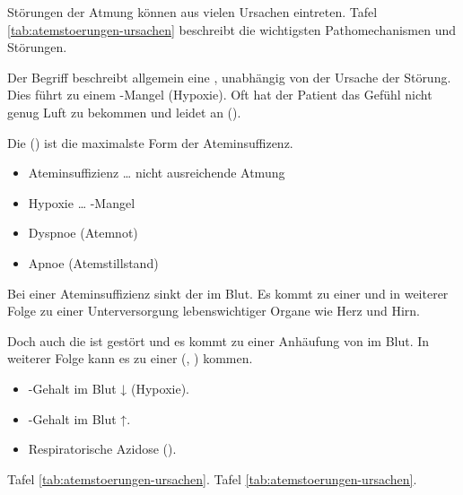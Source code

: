 {
Störungen der Atmung können aus vielen Ursachen eintreten. Tafel
\ref{tab:atemstoerungen-ursachen} beschreibt die wichtigsten Pathomechanismen
und Störungen. 

Der Begriff
beschreibt allgemein eine , unabhängig von der Ursache der Störung. Dies führt zu einem -Mangel (Hypoxie). Oft hat der Patient das Gefühl nicht genug
Luft zu bekommen und leidet an  ().

Die  () ist die maximalste Form der
Ateminsuffizenz.
}{
\begin{itemize}
  \item Ateminsuffizienz \ldots{} nicht ausreichende Atmung
  \item Hypoxie \ldots{} -Mangel
  \item Dyspnoe (Atemnot)
  \item Apnoe (Atemstillstand)
\end{itemize}
}{}{}{}


{
Bei einer Ateminsuffizienz sinkt der  im Blut. Es kommt zu
einer  und in weiterer Folge zu einer Unterversorgung
lebenswichtiger Organe wie Herz und Hirn. 

Doch auch die  ist gestört und es kommt zu einer Anhäufung
von  im Blut. In weiterer Folge kann es zu einer  (, 
) kommen.
}{
\begin{itemize}
    \item {}-Gehalt im Blut ↓ (Hypoxie).
    \item {}-Gehalt im Blut ↑.
    \item Respiratorische Azidose ().
\end{itemize}
}{}{}{}




{
Tafel \ref{tab:atemstoerungen-ursachen}.
}{Tafel \ref{tab:atemstoerungen-ursachen}.}{}{}{}


